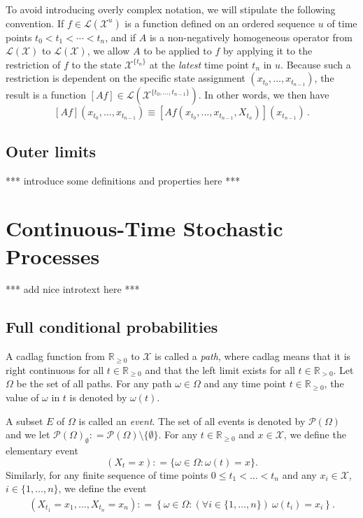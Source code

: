 \documentclass[10pt]{paper}
\theoremstyle{definition}
\newcommand{\reals}{\mathbb{R}}
\newcommand{\realspos}{\reals_{>0}}
\newcommand{\realsnonneg}{\reals_{\geq 0}}
\newcommand{\states}{\mathcal{X}}
\newcommand{\paths}{\Omega}
\newcommand{\path}{\omega}
\newcommand{\power}{\mathcal{P}(\paths)}
\newcommand{\nonemptypower}{\power_{\emptyset}}
\newcommand{\events}{\mathcal{E}}
\newcommand{\gambles}{\mathcal{L}}
\newcommand{\gamblesX}{\gambles(\states)}
\newcommand{\coloneqq}{:\!=}
\begin{document}
To avoid introducing overly complex notation, we will stipulate the following convention. If $f\in\gambles(\states^u)$ is a function defined on an ordered sequence $u$ of time points $t_0<t_1<\cdots<t_n$, and if $A$ is a non-negatively homogeneous operator from $\gamblesX$ to $\gamblesX$, we allow $A$ to be applied to $f$ by applying it to the restriction of $f$ to the state $\states^{\{t_n\}}$ at the \emph{latest} time point $t_n$ in $u$. Because such a restriction is dependent on the specific state assignment $(x_{t_0},\ldots,x_{t_{n-1}})$, the result is a function $[Af]\in\gambles(\states^{\{t_0,\ldots,t_{n-1}\}})$. In other words, we then have
\begin{equation*}
\left[Af\right](x_{t_0},\ldots,x_{t_{n-1}}) \equiv \left[A f(x_{t_0},\ldots,x_{t_{n-1}},X_{t_n})\right](x_{t_{n-1}})\,.
\end{equation*}

\subsection{Outer limits}

*** introduce some definitions and properties here ***


\section{Continuous-Time Stochastic Processes}

*** add nice introtext here ***

\subsection{Full conditional probabilities}

A cadlag function from $\realsnonneg$ to $\states$ is called a \emph{path}, where cadlag means that it is right continuous for all $t\in\realsnonneg$ and that the left limit exists for all $t\in\realspos$. Let $\paths$ be the set of all paths. For any path $\path\in\paths$ and any time point $t\in\realsnonneg$, the value of $\path$ in $t$ is denoted by $\path(t)$.

A subset $E$ of $\paths$ is called an \emph{event}. The set of all events is denoted by $\power$ and we let $\nonemptypower\coloneqq\power\setminus\{\emptyset\}$. For any $t\in\realsnonneg$ and $x\in\states$, we define the elementary event
\begin{equation*}
(X_t=x)\coloneqq\{\path\in\paths\colon\path(t)=x\}.
\end{equation*}
Similarly, for any finite sequence of time points $0\leq t_1<\dots<t_n$ and any $x_{i}\in\states$, $i\in\{1,\dots,n\}$, we define the event
\begin{align*}
\left(X_{t_1}=x_{1}, \dots, X_{t_n}=x_{n}\right)
\coloneqq%
\left\{\path\in\paths\colon(\forall i\in\{1,\dots,n\})~\path(t_i)=x_{i}\right\}.%
\end{align*}
\end{document}
